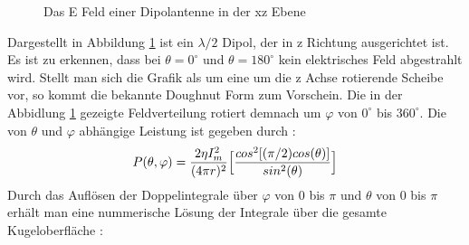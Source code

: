 \begin{figure}[!ht]
\begin{center}
\end{center}
	\caption{Das E Feld einer Dipolantenne in der xz Ebene}
	\label{fig:DipolEFerd}
\end{figure}
Dargestellt in Abbildung \ref{fig:DipolEFerd} ist ein $\lambda/2$ Dipol, der in z Richtung ausgerichtet ist. Es ist zu erkennen, dass bei $\theta = 0 ^\circ $  und $\theta = 180 ^\circ $ kein elektrisches Feld abgestrahlt wird. Stellt man sich die Grafik als um eine um  die z Achse rotierende Scheibe vor, so kommt die bekannte Doughnut Form zum Vorschein. Die in der Abbidlung \ref{fig:DipolEFerd}  gezeigte Feldverteilung  rotiert demnach um $\varphi$ von $0 ^\circ $ bis $360 ^\circ $.
Die von $\theta$ und $\varphi$ abhängige Leistung ist gegeben durch \cite{elliott1981antenna}:
\begin{equation}
P(\theta,\varphi)=\frac{2\eta I_{m}^{2}}{(4\pi r)^{2}}\Bigl\lbrack \frac{cos^{2}\lbrack  (\pi/2) cos(\theta)\rbrack}{sin^{2}(\theta)}\Bigr\rbrack
\end{equation}
Durch das Auflösen der Doppelintegrale über $\varphi$ von 0 bis $\pi$  und $\theta$ von 0 bis $\pi$ erhält man eine nummerische Lösung der Integrale über die gesamte Kugeloberfläche \cite{elliott1981antenna}:
